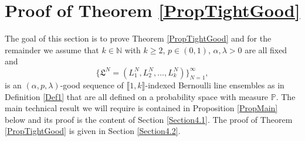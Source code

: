 
%
\section{Proof of Theorem \ref{PropTightGood} }\label{Section4}


The goal of this section is to prove Theorem \ref{PropTightGood} and for the remainder we assume that $k \in \mathbb{N}$ with $k \geq 2$, $p \in (0,1)$, $\alpha, \lambda > 0$ are all fixed and 
\begin{equation}\label{eqalphagood}
\big\{\mathfrak{L}^N = (L^N_1,L^N_2, \dots, L^N_k)\big\}_{N=1}^{\infty},
\end{equation}
 is an $(\alpha,p,\lambda)$-good sequence of $\llbracket 1, k\rrbracket$-indexed Bernoulli line ensembles as in Definition \ref{Def1} that are all defined on a probability space with measure $\mathbb{P}$. The main technical result we will require is contained in Proposition \ref{PropMain} below and its proof is the content of Section \ref{Section4.1}. The proof of Theorem \ref{PropTightGood} is given in Section \ref{Section4.2}.
%

